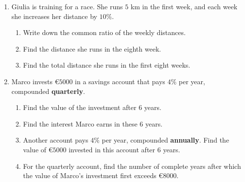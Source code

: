 \documentclass[12pt, twoside]{article}
\begin{document}
\begin{enumerate}[itemsep=0.15cm]
\newpage

\item[7.]
Giulia is training for a race. She runs $5$ km in the first week, and
each week she increases her distance by $10\%$.

\begin{enumerate}[itemsep=0.1cm]
  \item Write down the common ratio of the weekly distances. \vfill
  \item Find the distance she runs in the eighth week. \vfill
  \item Find the total distance she runs in the first eight weeks. \vfill
\end{enumerate}

\item[8.]
Marco invests \euro$5000$ in a savings account that pays $4\%$ per year,
compounded \textbf{quarterly}.

\begin{enumerate}[itemsep=0.1cm]
  \item Find the value of the investment after $6$ years. \vfill
  \item Find the interest Marco earns in these $6$ years. \vfill
  \item Another account pays $4\%$ per year, compounded
  \textbf{annually}. Find the value of \euro$5000$ invested in this
  account after $6$ years. \vfill
  \item For the quarterly account, find the number of complete years
  after which the value of Marco's investment first exceeds
  \euro$8000$. \vfill
\end{enumerate}

\end{enumerate}
\end{document}
